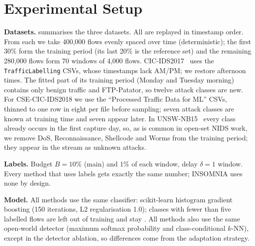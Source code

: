 \section{Experimental Setup}
\label{sec:setup}

\textbf{Datasets.}  summarises the three datasets. All are replayed in timestamp order.
From each we take 400{,}000 flows evenly spaced over time (deterministic); the first 30\% form the training
period (its last 20\% is the reference set) and the remaining 280{,}000 flows form 70 windows of 4{,}000 flows.
CIC-IDS2017~\cite{sharafaldin2018} uses the \texttt{TrafficLabelling} CSVs, whose timestamps lack AM/PM; we
restore afternoon times. The fitted part of its training period (Monday and Tuesday morning) contains only
benign traffic and FTP-Patator, so twelve attack classes are new. For CSE-CIC-IDS2018 we use the ``Processed Traffic Data for ML''
CSVs, thinned to one row in eight per file before sampling; seven attack classes are known at training time and
seven appear later. In UNSW-NB15~\cite{moustafa2015unsw} every class already occurs in the first capture day, so,
as is common in open-set NIDS work, we remove DoS, Reconnaissance, Shellcode and Worms from the training
period; they appear in the stream as unknown attacks.

\begin{table}[t]
\centering
\caption{Datasets (after replay sampling: 400k flows, 70 windows).}
\label{tab:datasets}
\end{table}

\textbf{Labels.} Budget $B = 10\%$ (main) and $1\%$ of each window, delay $\delta = 1$ window. Every method that
uses labels gets exactly the same number; INSOMNIA uses none by design.

\textbf{Model.} All methods use the same classifier: scikit-learn histogram gradient boosting (150 iterations,
L2 regularisation 1.0); classes with fewer than five labelled flows are left out of training and stay \unk{}.
All methods also use the same open-world detector (maximum softmax probability and class-conditional $k$-NN),
except in the detector ablation, so differences come from the adaptation strategy.

